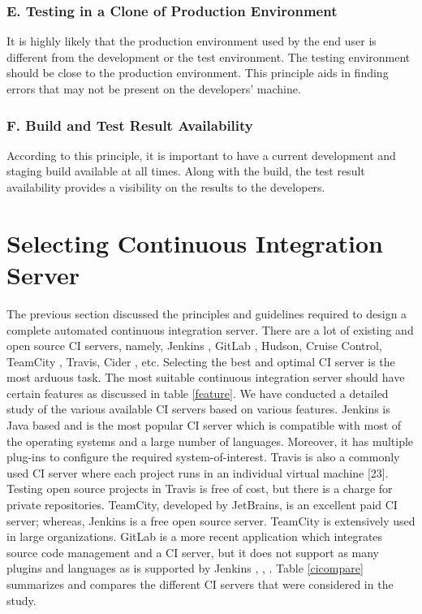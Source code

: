 \documentclass[10pt]{ruthesis}
\begin{document}
\subsubsection{\textbf{E. Testing in a Clone of Production Environment}}
It is highly likely that the production environment used by the end user is different from the development or the test environment. The testing environment should be close to the production environment. This principle aids in finding errors that may not be present on the developers' machine. 

\subsubsection{\textbf{F. Build and Test Result Availability}}
According to this principle, it is important to have a current development and staging build available at all times. Along with the build, the test result availability provides a visibility on the results to the developers.




\section{Selecting Continuous Integration Server}
The previous section discussed the principles and guidelines required to design a complete automated continuous integration server. There are a lot of existing and open source CI servers, namely, Jenkins \cite{site5}, GitLab \cite{site6}, Hudson, Cruise Control, TeamCity \cite{site7}, Travis, Cider \cite{ref18}, etc. Selecting the best and optimal CI server is the most arduous task. The most suitable continuous integration server should have certain features as discussed in table \ref{feature}. We have conducted a detailed study of the various available CI servers based on various features. Jenkins is Java based and is the most popular CI server which is compatible with most of the operating systems and a large number of languages. Moreover, it has multiple plug-ins to configure the required system-of-interest. Travis is also a commonly used CI server where each project runs in an individual virtual machine [23]. Testing open source projects in Travis is free of cost, but there is a charge for private repositories. TeamCity, developed by JetBrains, is an excellent paid CI server; whereas, Jenkins is a free open source server. TeamCity is extensively used in large organizations. GitLab is a more recent application which integrates source code management and a CI server, but it does not support as many plugins and languages as is supported by Jenkins \cite{ref16}, \cite{ref17}, \cite{ref20}. Table \ref{cicompare} summarizes and compares the different CI servers that were considered in the study.
\end{document}
